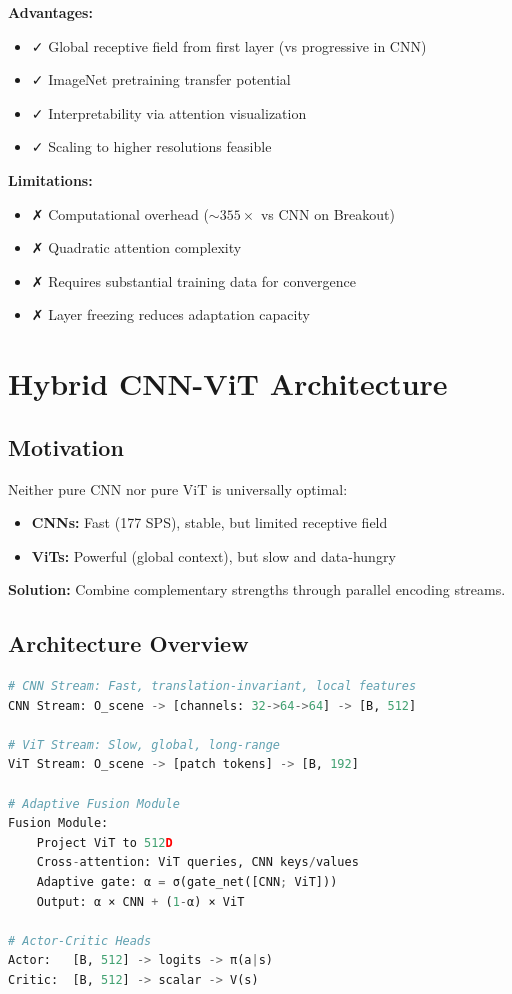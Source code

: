 \documentclass[12pt,a4paper,openany]{report}
\begin{document}
\textbf{Advantages:}
\begin{itemize}
    \item ✓ Global receptive field from first layer (vs progressive in CNN)
    \item ✓ ImageNet pretraining transfer potential
    \item ✓ Interpretability via attention visualization
    \item ✓ Scaling to higher resolutions feasible
\end{itemize}

\textbf{Limitations:}
\begin{itemize}
    \item ✗ Computational overhead ($\sim 355\times$ vs CNN on Breakout)
    \item ✗ Quadratic attention complexity
    \item ✗ Requires substantial training data for convergence
    \item ✗ Layer freezing reduces adaptation capacity
\end{itemize}

\section{Hybrid CNN-ViT Architecture}

\subsection{Motivation}

Neither pure CNN nor pure ViT is universally optimal:

\begin{itemize}
    \item \textbf{CNNs:} Fast (177 SPS), stable, but limited receptive field
    \item \textbf{ViTs:} Powerful (global context), but slow and data-hungry
\end{itemize}

\textbf{Solution:} Combine complementary strengths through parallel encoding streams.

\subsection{Architecture Overview}

\begin{lstlisting}[language=Python, caption=Hybrid CNN-ViT Architecture]
# CNN Stream: Fast, translation-invariant, local features
CNN Stream: O_scene -> [channels: 32->64->64] -> [B, 512]

# ViT Stream: Slow, global, long-range
ViT Stream: O_scene -> [patch tokens] -> [B, 192]

# Adaptive Fusion Module
Fusion Module: 
    Project ViT to 512D
    Cross-attention: ViT queries, CNN keys/values
    Adaptive gate: α = σ(gate_net([CNN; ViT]))
    Output: α × CNN + (1-α) × ViT

# Actor-Critic Heads
Actor:   [B, 512] -> logits -> π(a|s)
Critic:  [B, 512] -> scalar -> V(s)
\end{lstlisting}
\end{document}
